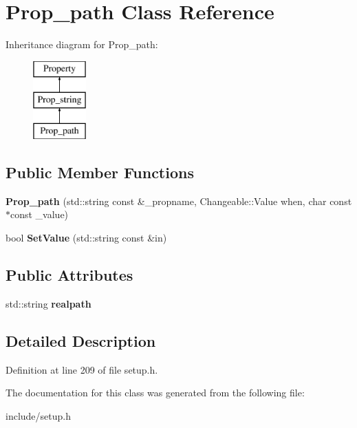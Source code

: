 \hypertarget{classProp__path}{\section{Prop\-\_\-path Class Reference}
\label{classProp__path}
}
Inheritance diagram for Prop\-\_\-path\-:\begin{figure}[H]
\begin{center}
\leavevmode
\includegraphics[height=3.000000cm]{classProp__path}
\end{center}
\end{figure}
\subsection*{Public Member Functions}
\begin{DoxyCompactItemize}
\item 
\hypertarget{classProp__path_a913eabbbfd399fed38f39381946e2eba}{{\bfseries Prop\-\_\-path} (std\-::string const \&\-\_\-propname, Changeable\-::\-Value when, char const $\ast$const \-\_\-value)}\label{classProp__path_a913eabbbfd399fed38f39381946e2eba}

\item 
\hypertarget{classProp__path_a0ba43ea1b4d1be0feb1ee6aa13428ed4}{bool {\bfseries Set\-Value} (std\-::string const \&in)}\label{classProp__path_a0ba43ea1b4d1be0feb1ee6aa13428ed4}

\end{DoxyCompactItemize}
\subsection*{Public Attributes}
\begin{DoxyCompactItemize}
\item 
\hypertarget{classProp__path_aa4281b80a9ba382027add3a82eecd7c3}{std\-::string {\bfseries realpath}}\label{classProp__path_aa4281b80a9ba382027add3a82eecd7c3}

\end{DoxyCompactItemize}


\subsection{Detailed Description}


Definition at line 209 of file setup.\-h.



The documentation for this class was generated from the following file\-:\begin{DoxyCompactItemize}
\item 
include/setup.\-h\end{DoxyCompactItemize}
